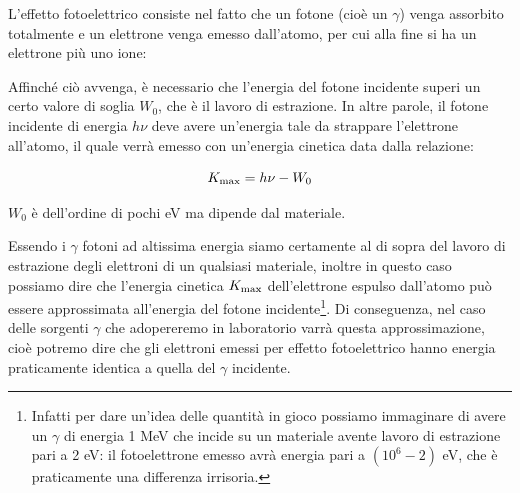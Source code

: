 L'effetto fotoelettrico consiste nel fatto che un fotone (cioè un $\gamma$) venga assorbito totalmente e un elettrone venga emesso dall'atomo, per cui alla fine si ha un elettrone più uno ione:

\begin{figure}[H]
    \centering
\end{figure}

Affinché ciò avvenga, è necessario che l'energia del fotone incidente superi un certo valore di soglia $W_0$, che è il lavoro di estrazione. In altre parole, il fotone incidente di energia $h\nu$ deve avere un'energia tale da strappare l'elettrone all'atomo, il quale verrà emesso con un'energia cinetica data dalla relazione:

\begin{equation*}
    K_{\rm max}=h\nu - W_0
\end{equation*}

$W_0$ è dell'ordine di pochi eV ma dipende dal materiale.

Essendo i $\gamma$ fotoni ad altissima energia siamo certamente al di sopra del lavoro di estrazione degli elettroni di un qualsiasi materiale, inoltre in questo caso possiamo dire che l'energia cinetica $K_{\rm max}$ dell'elettrone espulso dall'atomo può essere approssimata all'energia del fotone incidente\footnote{Infatti per dare un'idea delle quantità in gioco possiamo immaginare di avere un $\gamma$ di energia 1 MeV che incide su un materiale avente lavoro di estrazione pari a 2 eV: il fotoelettrone emesso avrà energia pari a $(10^6 - 2)$ eV, che è praticamente una differenza irrisoria.}. Di conseguenza, nel caso delle sorgenti $\gamma$ che adopereremo in laboratorio varrà questa approssimazione, cioè potremo dire che gli elettroni emessi per effetto fotoelettrico hanno energia praticamente identica a quella del $\gamma$ incidente.

